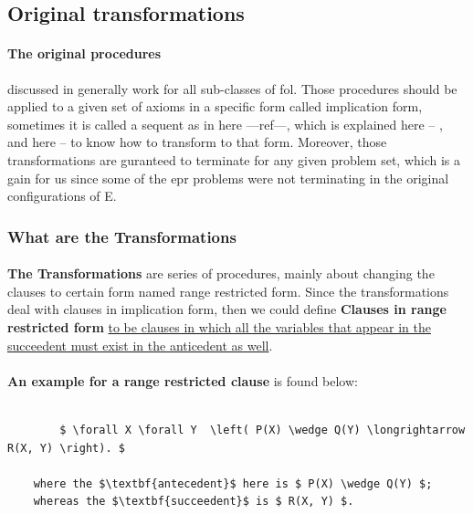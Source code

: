 \subsection{Original transformations}\label{sub:c3s1s1}
	\paragraph{The original procedures} discussed in \cite{BMUG06} generally work for all sub-classes of \ac{fol}. Those procedures should be applied to a given set of axioms in a specific form called implication form, sometimes it is called a sequent as in here ---ref---, which is explained here -- , and here -- to know how to transform to that form. Moreover, those transformations are guranteed to terminate for any given problem set, which is a gain for us since some of the \ac{epr} problems were not terminating in the original configurations of E.  

	\subsubsection{What are the Transformations}
	
		\paragraph{} 
		\textbf{The Transformations} are series of procedures, mainly about changing the clauses to certain form named range restricted form. Since the transformations deal with clauses in implication form, then we could define \textbf{Clauses in range restricted form} \ul{to be clauses in which all the variables that appear in the succeedent must exist in the anticedent as well}.
	
		\paragraph{} 
		\textbf{An example for a range restricted clause} is found below:
			\begin{lstlisting}[caption=Range Restricted Clause Example,frame=single,mathescape]			
		
		$ \forall X \forall Y  \left( P(X) \wedge Q(Y) \longrightarrow R(X, Y) \right). $				
		
	where the $\textbf{antecedent}$ here is $ P(X) \wedge Q(Y) $;
	whereas the $\textbf{succeedent}$ is $ R(X, Y) $.
 			\end{lstlisting}
		
